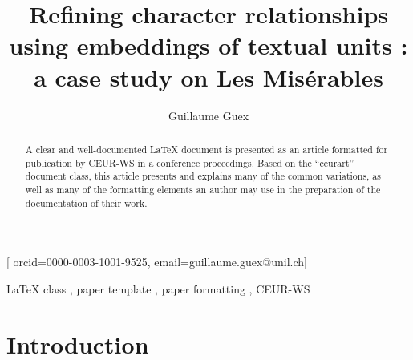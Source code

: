 \documentclass[
twocolumn,
]{ceurart}
\begin{document}


\title{Refining character relationships using embeddings of textual units : a case study on Les Misérables}

\author[1]{Guillaume Guex}[%
orcid=0000-0003-1001-9525,
email=guillaume.guex@unil.ch]
\address[1]{Departement of Language and Information Sciences, University of Lausanne, Switzerland}

\begin{abstract}
  A clear and well-documented \LaTeX{} document is presented as an
  article formatted for publication by CEUR-WS in a conference
  proceedings. Based on the ``ceurart'' document class, this article
  presents and explains many of the common variations, as well as many
  of the formatting elements an author may use in the preparation of
  the documentation of their work.
\end{abstract}

\begin{keywords}
  LaTeX class \sep
  paper template \sep
  paper formatting \sep
  CEUR-WS
\end{keywords}

\maketitle

\section{Introduction}
\end{document}
